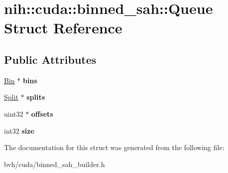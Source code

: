 \hypertarget{structnih_1_1cuda_1_1binned__sah_1_1_queue}{
\section{nih\-:\-:cuda\-:\-:binned\-\_\-sah\-:\-:\-Queue \-Struct \-Reference}
\label{structnih_1_1cuda_1_1binned__sah_1_1_queue}
}
\subsection*{\-Public \-Attributes}
\begin{DoxyCompactItemize}
\item 
\hypertarget{structnih_1_1cuda_1_1binned__sah_1_1_queue_aff238d4fb334d54c834940553943ed09}{
\hyperlink{structnih_1_1cuda_1_1binned__sah_1_1_bin}{\-Bin} $\ast$ {\bfseries bins}}
\label{structnih_1_1cuda_1_1binned__sah_1_1_queue_aff238d4fb334d54c834940553943ed09}

\item 
\hypertarget{structnih_1_1cuda_1_1binned__sah_1_1_queue_ad4afdd0276383ba3579f6336ffc7d4a1}{
\hyperlink{structnih_1_1cuda_1_1binned__sah_1_1_split}{\-Split} $\ast$ {\bfseries splits}}
\label{structnih_1_1cuda_1_1binned__sah_1_1_queue_ad4afdd0276383ba3579f6336ffc7d4a1}

\item 
\hypertarget{structnih_1_1cuda_1_1binned__sah_1_1_queue_a1af898af00d47778ec05e38db8af54df}{
uint32 $\ast$ {\bfseries offsets}}
\label{structnih_1_1cuda_1_1binned__sah_1_1_queue_a1af898af00d47778ec05e38db8af54df}

\item 
\hypertarget{structnih_1_1cuda_1_1binned__sah_1_1_queue_a2eb71c1a3d35300313a8af98235f6110}{
int32 {\bfseries size}}
\label{structnih_1_1cuda_1_1binned__sah_1_1_queue_a2eb71c1a3d35300313a8af98235f6110}

\end{DoxyCompactItemize}


\-The documentation for this struct was generated from the following file\-:\begin{DoxyCompactItemize}
\item 
bvh/cuda/binned\-\_\-sah\-\_\-builder.\-h\end{DoxyCompactItemize}
